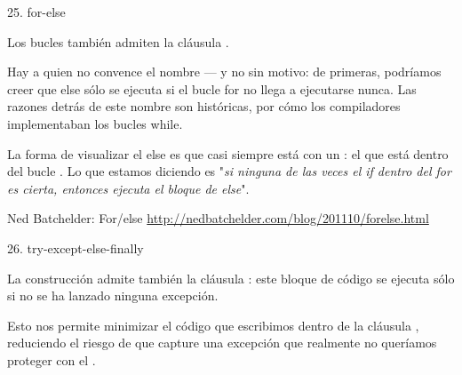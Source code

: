 \documentclass[14pt]{beamer}
\begin{document}
\begin{frame}[fragile]{25. for-else}
  \begin{alertblock}{}
    \centering
    Los bucles  también admiten la cláusula
    .
  \end{alertblock}

  \footnotesize
  Hay a quien no convence el nombre --- y no sin motivo: de
  primeras, podríamos creer que else sólo se ejecuta si el bucle for
  no llega a ejecutarse nunca. Las razones detrás de este nombre son
  históricas, por cómo los compiladores implementaban los bucles
  while.

  La forma de visualizar el else es que casi siempre está
   con un : el que está dentro del
  bucle . Lo que estamos diciendo es "\emph{si ninguna
    de las veces el if dentro del for es cierta, entonces ejecuta el
    bloque de else}".

  \begin{block}
    {\centering Ned Batchelder: For/else}
    \centering \url{http://nedbatchelder.com/blog/201110/forelse.html}
  \end{block}
\end{frame}

\begin{frame}[fragile]{26. try-except-else-finally}
  \begin{alertblock}{}
    \centering
    La construcción  admite también la
    cláusula : este bloque de código se ejecuta sólo
    si no se ha lanzado ninguna excepción.
  \end{alertblock}

  \begin{center}
    \small
    Esto nos permite minimizar el código que escribimos dentro de la
    cláusula , reduciendo el riesgo de que
     capture una excepción que realmente no
    queríamos proteger con el .
  \end{center}
\end{frame}
\end{document}
